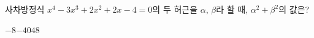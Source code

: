 사차방정식 $x^4-3x^3+2x^2+2x-4=0$의 두 허근을 $\alpha$, $\beta$라 할 때, $\alpha^2+\beta^2$의 값은?
\begin{choices32}{$-8$}{$-4$}{$0$}{$4$}{$8$}\end{choices32}
